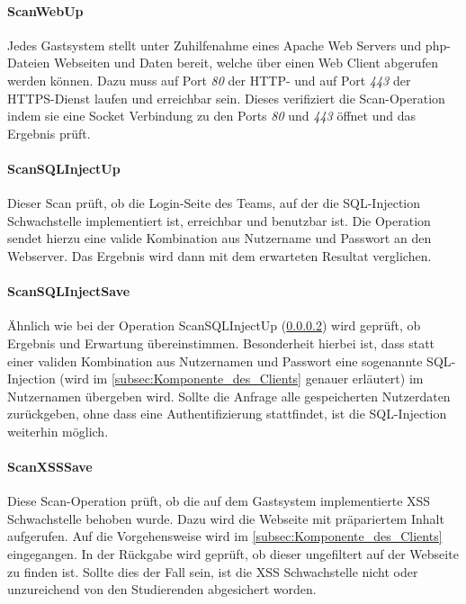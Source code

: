 \paragraph{ScanWebUp}\label{para:ScanWebUp}
Jedes Gastsystem stellt unter Zuhilfenahme eines Apache Web Servers und php-Dateien Webseiten und Daten bereit, welche über einen Web Client abgerufen werden können. Dazu muss auf Port \textit{80} der HTTP- und auf Port \textit{443} der HTTPS-Dienst laufen und erreichbar sein. Dieses verifiziert die Scan-Operation indem sie eine Socket Verbindung zu den Ports \textit{80} und \textit{443} öffnet und das Ergebnis prüft.

\paragraph{ScanSQLInjectUp}\label{para:ScanSQLInjectUp}
Dieser Scan prüft, ob die Login-Seite des Teams, auf der die SQL-Injection Schwachstelle implementiert ist, erreichbar und benutzbar ist. Die Operation sendet hierzu eine valide Kombination aus Nutzername und Passwort an den Webserver. Das Ergebnis wird dann mit dem erwarteten Resultat verglichen.

\paragraph{ScanSQLInjectSave}\label{para:ScanSQLInjectSave}
Ähnlich wie bei der Operation ScanSQLInjectUp (\ref{para:ScanSQLInjectUp}) wird geprüft, ob Ergebnis und Erwartung übereinstimmen. Besonderheit hierbei ist, dass statt einer validen Kombination aus Nutzernamen und Passwort eine sogenannte SQL-Injection (wird im \autoref{subsec:Komponente_des_Clients} genauer erläutert) im Nutzernamen übergeben wird.  
Sollte die Anfrage alle gespeicherten Nutzerdaten zurückgeben, ohne dass eine Authentifizierung stattfindet, ist die SQL-Injection weiterhin möglich.

\paragraph{ScanXSSSave}\label{para:ScanXSSSave}
Diese Scan-Operation prüft, ob die auf dem Gastsystem implementierte XSS Schwachstelle behoben wurde. Dazu wird die Webseite mit präpariertem Inhalt aufgerufen. Auf die Vorgehensweise wird im \autoref{subsec:Komponente_des_Clients} eingegangen.
In der Rückgabe wird geprüft, ob dieser ungefiltert auf der Webseite zu finden ist. Sollte dies der Fall sein, ist die XSS Schwachstelle nicht oder unzureichend von den Studierenden abgesichert worden.

